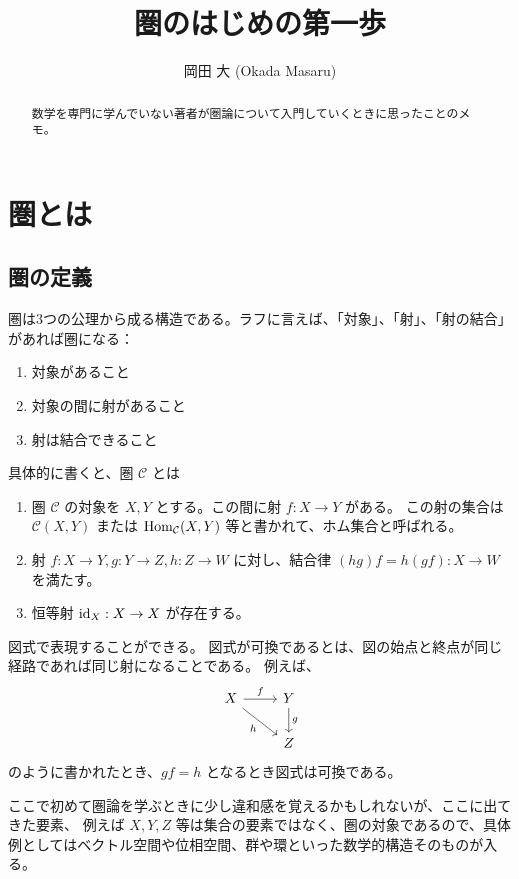 \documentclass[uplatex,a4j,12pt,dvipdfmx]{jsarticle}
\title{
圏のはじめの第一歩
}
\author{
岡田 大 (Okada Masaru)
}
\begin{document}
\maketitle

\begin{abstract}
数学を専門に学んでいない著者が圏論について入門していくときに思ったことのメモ。
\end{abstract}

\section{圏とは}

\subsection{圏の定義}

圏は3つの公理から成る構造である。ラフに言えば、「対象」、「射」、「射の結合」があれば圏になる：

\begin{enumerate}
    \item 対象があること
    \item 対象の間に射があること
    \item 射は結合できること
\end{enumerate}

具体的に書くと、圏 ${\mathcal C}$ とは

\begin{enumerate}
    \item 圏 ${\mathcal C}$ の対象を $X,Y$ とする。この間に射 $f: X \to Y$ がある。
    この射の集合は ${\mathcal C}(X,Y)$ または ${\rm Hom}_{\mathcal C}(X,Y)$ 等と書かれて、ホム集合と呼ばれる。
    \item 射 $f: X \to Y, g: Y \to Z, h: Z \to W$ に対し、結合律 $(hg)f = h(gf): X \to W$ を満たす。
    \item 恒等射 ${\rm id}_{X}: X \to X$ が存在する。
\end{enumerate}

図式で表現することができる。
図式が可換であるとは、図の始点と終点が同じ経路であれば同じ射になることである。
例えば、
\[
\begin{tikzcd}
X \arrow[r,"f"]\arrow[rd,"h"'] & Y \arrow[d,"g"]\\
& Z
\end{tikzcd}
\]
のように書かれたとき、$gf=h$ となるとき図式は可換である。

ここで初めて圏論を学ぶときに少し違和感を覚えるかもしれないが、ここに出てきた要素、
例えば
$X,Y,Z$
等は集合の要素ではなく、圏の対象であるので、具体例としてはベクトル空間や位相空間、群や環といった数学的構造そのものが入る。
\end{document}
